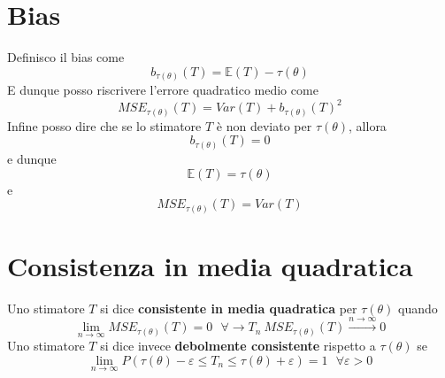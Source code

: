 \documentclass[11pt]{report}
\begin{document}
\section{Bias}
Definisco il bias come
\begin{equation}
	b_{\tau(\theta)}(T) = \mathbb{E}(T) - \tau(\theta)
\end{equation}
E dunque posso riscrivere l'errore quadratico medio come
\begin{equation}
	MSE_{\tau(\theta)}(T) = Var(T) + b_{\tau(\theta)}(T)^2
\end{equation}
Infine posso dire che se lo stimatore $T$ è non deviato per $\tau(\theta)$, allora
\begin{equation}
	b_{\tau(\theta)}(T) = 0
\end{equation}
e dunque
\begin{equation}
	\mathbb{E}(T) = \tau(\theta)
\end{equation}
e
\begin{equation}
	MSE_{\tau(\theta)}(T) = Var(T)
\end{equation}

\section{Consistenza in media quadratica}
Uno stimatore $T$ si dice \textbf{consistente in media quadratica} per $\tau(\theta)$ quando
\begin{equation}
	\lim_{n\rightarrow\infty} MSE_{\tau(\theta)}(T) = 0\ \ \ \forall \rightarrow T_n\ MSE_{\tau(\theta)}(T) \overset{n\rightarrow\infty}{\rightarrow} 0
\end{equation}
Uno stimatore $T$ si dice invece \textbf{debolmente consistente} rispetto a $\tau(\theta)$ se
\begin{equation}
	\lim_{n\rightarrow\infty} P(\tau(\theta) - \varepsilon \leq T_n \leq \tau(\theta) + \varepsilon) = 1\ \ \ \forall \varepsilon > 0
\end{equation}
\end{document}
